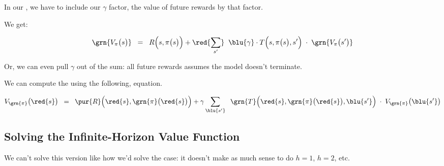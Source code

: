         \begin{concept}
            In our , we have to include our $\gamma$ factor,  the value of future rewards by that factor.
        \end{concept}

        We get:

        \begin{equation}
            \grn{V_{\pi}\big(s \big)} \;\;=\;\; 
                    R \Big( s,\pi\big(s\big) \Big)
                +
                    \red{\sum_{s'}}  
                        \;\;
                        \blu{\gamma} \cdot 
                        T \Big(          s,\pi\big(s\big),s' \Big)
                        \;\cdot\; 
                        \grn{V_{\pi}\big(s' \big)}
        \end{equation}

        Or, we can even pull $\gamma$ out of the sum: all future rewards assumes the model doesn't terminate.\\

        \begin{kequation}
            We can compute the  using the following,  equation.

                \begin{equation*}
                    V_{\grn{\pi}}\big(\red{s} \big) \;\;=\;\; 
                        \pur{R} \Big( \red{s},\grn{\pi}\big(\red{s}\big) \Big) +
                    \gamma
                    \sum_{\blu{s'}}  
                            \;\;
                            \grn{T} \Big(          \red{s},\grn{\pi}\big(\red{s}\big),\blu{s'} \Big)
                            \;\cdot\; 
                            V_{\grn{\pi}}\big(\blu{s'} \big)
                \end{equation*}
        \end{kequation}




    \phantom{}


    

    \subsection{Solving the Infinite-Horizon Value Function}

        We can't solve this version like how we'd solve the  case: it doesn't make as much sense to do $h=1$, $h=2$, etc.

